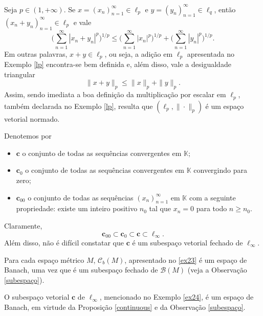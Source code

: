 \begin{corollary}\label{dms}
    Seja $p\in (1,+\infty)$. Se $x=(x_n)_{n=1}^{\infty} \in \ell_p $ e $y=(y_n)_{n=1}^{\infty} \in \ell_q$, então $(x_n + y_n)_{n=1}^{\infty} \in \ell_p$ e vale
     \[
    \displaystyle \bigg( \sum_{n=1}^{\infty} |x_n + y_n|^p \bigg)^{1/p} \leq \bigg( \sum_{n=1}^{\infty} |x_n|^p \bigg)^{1/p} +\bigg( \sum_{n=1}^{\infty} |y_n|^p \bigg)^{1/p} .
    \]
    Em outras palavras, $x+y \in \ell_p$, ou seja, a adição em $\ell_p$ apresentada no Exemplo \ref{lp} encontra-se bem definida e, além disso, vale a desigualdade triangular
    \[
    \displaystyle \|x+y\|_p \leq \|x\|_p +\|y\|_p.
    \]
    Assim, sendo imediata a boa definição da multiplicação por escalar em $\ell_p$, também declarada no Exemplo \ref{lp}, resulta que $(\ell_p , \|\cdot\|_p)$ é um espaço vetorial normado.
\end{corollary}    


\begin{example}\label{ex24}
Denotemos por
\begin{itemize}
\item $\textbf{c}$ o conjunto de todas as sequências convergentes em $\mathbb K$;
\item $\textbf{c}_0$ o conjunto de todas as sequências convergentes em $\mathbb K$ convergindo para zero;
\item $\textbf{c}_{00}$ o conjunto de todas as sequências $(x_n)_{n=1}^{\infty}$ em $\mathbb K$ com a seguinte propriedade: existe um inteiro positivo $n_0$ tal que $x_n=0$ para todo $n\geq n_0$.
\end{itemize}
Claramente, 
\[
\textbf{c}_{00} \subset \textbf{c}_{0} \subset \textbf{c} \subset \ell_{\infty}.
\]
Além disso, não é difícil constatar que $\textbf{c}$ é um subespaço vetorial fechado de $\ell_{\infty}$.
\end{example}

\begin{example}
    Para cada espaço métrico $M$, $\mathcal C _b (M)$, apresentado no \ref{ex23} é um espaço de Banach, uma vez que é um subespaço fechado de $\mathcal B (M)$ (veja a Observação \ref{subespaço}).
\end{example}

\begin{example}
O subespaço vetorial $\textbf{c}$ de $\ell_{\infty}$, mencionado no Exemplo \ref{ex24}, é um espaço de Banach, em virtude da Proposição \ref{continuous} e da Observação \ref{subespaço}.
\end{example}

